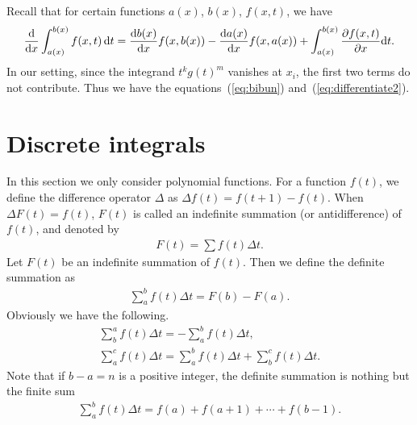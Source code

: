 \documentclass[10pt,a4paper]{amsart}
\numberwithin{equation}{section}
\newcommand{\sint}{\sum\nolimits}
\begin{document}
\begin{Remark}
\label{rem:details}
Recall that for certain functions $a(x)$, $b(x)$, $f(x, t)$, we have
\begin{gather*}
\frac{{\rm d}}{{\rm d}x}\int_{a(x)}^{b(x)}f(x, t)\,{\rm d}t=
\frac{{\rm d}b(x)}{{\rm d}x}f(x, b(x))-\frac{{\rm d}a(x)}{{\rm d}x}f(x, a(x))+
\int_{a(x)}^{b(x)}\frac{\partial f(x, t)}{\partial x}{\rm d}t.
\end{gather*}
In our setting, since the integrand $t^kg(t)^m$ vanishes at
$x_i$, the first two terms do not contribute. Thus we have
the equations~(\ref{eq:bibun}) and~(\ref{eq:differentiate2}).
\end{Remark}

\section{Discrete integrals}
\label{sec:discreteint}

In this section we only consider polynomial functions.
For a function $f(t)$, we define the difference operator $\Delta$ as
$\Delta f(t)=f(t+1)-f(t)$. When $\Delta F(t)=f(t)$,
$F(t)$ is called an indefinite summation (or antidifference)
of $f(t)$, and denoted by
\begin{gather*}
F(t)=\sint f(t)\Delta t.
\end{gather*}
Let $F(t)$ be an indefinite summation of $f(t)$. Then
we define the definite summation as
\begin{gather*}
\sint_a^b f(t)\Delta t=F(b)-F(a).
\end{gather*}
Obviously we have the following.
\begin{gather*}
\sint_b^af(t)\Delta t=-\sint_a^bf(t)\Delta t,
\\
\sint_a^cf(t)\Delta t=\sint_a^bf(t)\Delta t + \sint_b^cf(t)\Delta t.
\end{gather*}
Note that if $b-a=n$ is a positive integer, the definite summation
is nothing but the finite sum
\begin{gather}
\label{sumformula}
\sint_a^b f(t)\Delta t=f(a)+f(a+1)+\cdots+f(b-1).
\end{gather}
\end{document}

